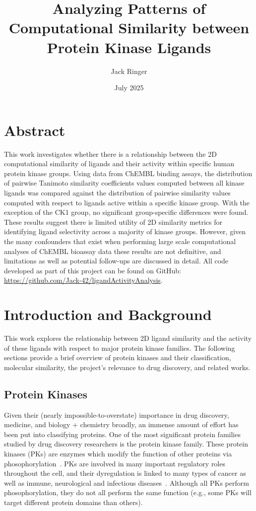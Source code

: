 \documentclass[11pt]{article}
\title{Analyzing Patterns of Computational Similarity between Protein Kinase Ligands}
\author{Jack Ringer}
\date{July 2025}
\begin{document}
\maketitle


\section*{Abstract}
This work investigates whether there is a relationship between the 2D computational similarity of ligands and their activity within specific human protein kinase groups.  
Using data from ChEMBL binding assays, the distribution of pairwise Tanimoto similarity coefficients values computed between all kinase ligands was compared against the distribution of pairwise similarity values computed with respect to ligands active within a specific kinase group. 
With the exception of the CK1 group, no significant group-specific differences were found. 
These results suggest there is limited utility of 2D similarity metrics for identifying ligand selectivity across a majority of kinase groups. 
However, given the many confounders that exist when performing large scale computational analyses of ChEMBL bioassay data these results are not definitive, and limitations as well as potential follow-ups are discussed in detail. 
All code developed as part of this project can be found on GitHub: \href{https://github.com/Jack-42/ligandActivityAnalysis}{https://github.com/Jack-42/ligandActivityAnalysis}. 

\section*{Introduction and Background}
This work explores the relationship between 2D ligand similarity and the activity of these ligands with respect to major protein kinase families. 
The following sections provide a brief overview of protein kinases and their classification, molecular similarity, the project's relevance to drug discovery, and related works.


\subsection*{Protein Kinases}
Given their (nearly impossible-to-overstate) importance in drug discovery, medicine, and biology + chemistry broadly, an immense amount of effort has been put into classifying proteins. 
One of the most significant protein families studied by drug discovery researchers is the protein kinase family. 
These protein kinases (PKs) are enzymes which modify the function of other proteins via phosophorylation~\cite{lubos_cipak_2022}. 
PKs are involved in many important regulatory roles throughout the cell, and their dyregulation is linked to many types of cancer as well as immune, neurological and infectious diseases~\cite{cancer as well as immune, neurological and infectious diseases}. 
Although all PKs perform phosophorylation, they do not all perform the same function (e.g., some PKs will target different protein domains than others). 
\end{document}
